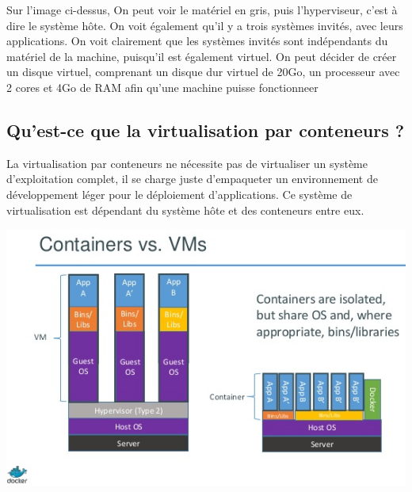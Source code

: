 \documentclass[12pt,a4paper]{article}
\begin{document}
Sur l'image ci-dessus, On peut voir le matériel en gris, puis l'hyperviseur, c'est à dire le système hôte. On voit également qu'il y a trois systèmes invités, avec leurs applications. On voit clairement que les systèmes invités sont indépendants du matériel de la machine, puisqu'il est également virtuel. On peut décider de créer un disque virtuel, comprenant un disque dur virtuel de 20Go, un processeur avec 2 cores et 4Go de RAM afin qu'une machine puisse fonctionneer



























\subsection{Qu'est-ce que la virtualisation par conteneurs ?}

La virtualisation par conteneurs ne nécessite pas de virtualiser un système d'exploitation complet, il se charge juste d'empaqueter un environnement de développement léger pour le déploiement d'applications. Ce système de virtualisation est dépendant du système hôte et des conteneurs entre eux. 

\begin{center}
  \includegraphics[width=15cm]{images_rapport/vm_container.jpg}
\end{center}
\end{document}
